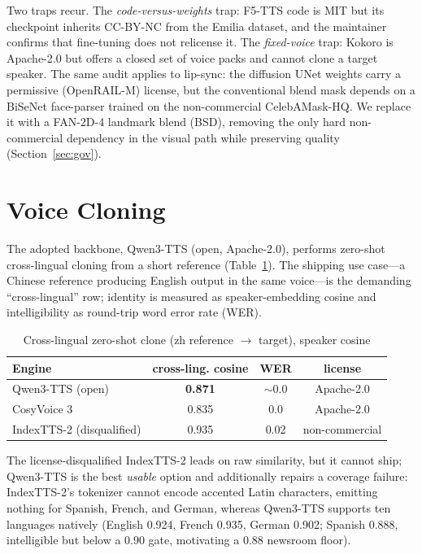 \documentclass[11pt,a4paper]{article}
\begin{document}
Two traps recur. The \emph{code-versus-weights} trap: F5-TTS code is MIT but its checkpoint inherits CC-BY-NC from the Emilia dataset, and the maintainer confirms that fine-tuning does not relicense it. The \emph{fixed-voice} trap: Kokoro is Apache-2.0 but offers a closed set of voice packs and cannot clone a target speaker. The same audit applies to lip-sync: the diffusion UNet weights carry a permissive (OpenRAIL-M) license, but the conventional blend mask depends on a BiSeNet face-parser trained on the non-commercial CelebAMask-HQ. We replace it with a FAN-2D-4 landmark blend (BSD), removing the only hard non-commercial dependency in the visual path while preserving quality (Section~\ref{sec:gov}).

\section{Voice Cloning}

The adopted backbone, Qwen3-TTS (open, Apache-2.0), performs zero-shot cross-lingual cloning from a short reference (Table~\ref{tab:voice}). The shipping use case---a Chinese reference producing English output in the same voice---is the demanding ``cross-lingual'' row; identity is measured as speaker-embedding cosine and intelligibility as round-trip word error rate (WER).

\begin{table}[H]
\centering
\caption{Cross-lingual zero-shot clone (zh reference $\rightarrow$ target), speaker cosine}
\label{tab:voice}
\begin{tabular}{lccc}
\toprule
Engine & cross-ling. cosine & WER & license \\
\midrule
Qwen3-TTS (open) & \textbf{0.871} & $\sim$0.0 & Apache-2.0 \\
CosyVoice 3 & 0.835 & 0.0 & Apache-2.0 \\
IndexTTS-2 (disqualified) & 0.935 & 0.02 & non-commercial \\
\bottomrule
\end{tabular}
\end{table}

The license-disqualified IndexTTS-2 leads on raw similarity, but it cannot ship; Qwen3-TTS is the best \emph{usable} option and additionally repairs a coverage failure: IndexTTS-2's tokenizer cannot encode accented Latin characters, emitting nothing for Spanish, French, and German, whereas Qwen3-TTS supports ten languages natively (English 0.924, French 0.935, German 0.902; Spanish 0.888, intelligible but below a 0.90 gate, motivating a 0.88 newsroom floor).
\end{document}
